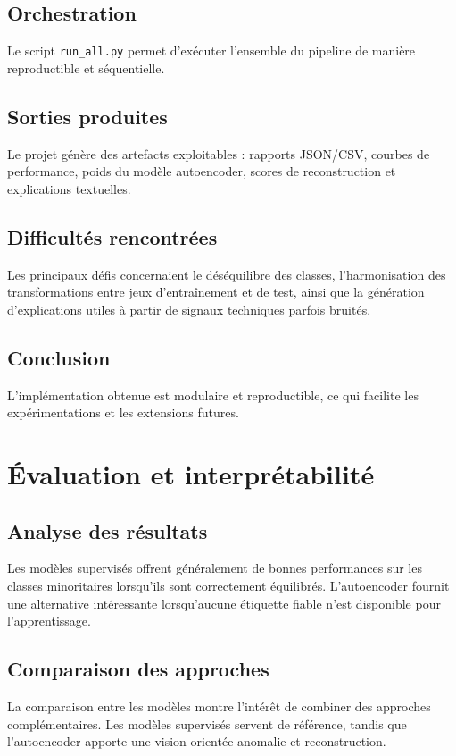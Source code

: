 \documentclass[12pt,a4paper,twoside]{report}
\begin{document}
\section{Orchestration}
Le script \texttt{run_all.py} permet d'exécuter l'ensemble du pipeline de manière reproductible et séquentielle.

\section{Sorties produites}
Le projet génère des artefacts exploitables : rapports JSON/CSV, courbes de performance, poids du modèle autoencoder, scores de reconstruction et explications textuelles.

\section{Difficultés rencontrées}
Les principaux défis concernaient le déséquilibre des classes, l'harmonisation des transformations entre jeux d'entraînement et de test, ainsi que la génération d'explications utiles à partir de signaux techniques parfois bruités.

\section{Conclusion}
L'implémentation obtenue est modulaire et reproductible, ce qui facilite les expérimentations et les extensions futures.

\chapter{Évaluation et interprétabilité}

\section{Analyse des résultats}
Les modèles supervisés offrent généralement de bonnes performances sur les classes minoritaires lorsqu'ils sont correctement équilibrés. L'autoencoder fournit une alternative intéressante lorsqu'aucune étiquette fiable n'est disponible pour l'apprentissage.

\section{Comparaison des approches}
La comparaison entre les modèles montre l'intérêt de combiner des approches complémentaires. Les modèles supervisés servent de référence, tandis que l'autoencoder apporte une vision orientée anomalie et reconstruction.
\end{document}
